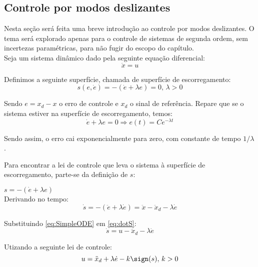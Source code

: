 \subsection{Controle por modos deslizantes}\label{S02-3}

Nesta se\c{c}\~ao ser\'a feita uma breve introdu\c{c}\~ao ao controle por modos deslizantes. O tema ser\'a explorado apenas para o controle de sistemas de segunda ordem, sem incertezas param\'etricas, para n\~ao fugir do escopo do cap\'itulo. \\

Seja um sistema din\^amico dado pela seguinte equa\c{c}\~ao diferencial:
\begin{equation} \label{eq:SimpleODE}
\ddot{x} = u
\end{equation}

Definimos a seguinte superf\'icie, chamada de superf\'icie de escorregamento:
\begin{equation} \label{eq:SlidingSurface}
s(e, \dot{e}) = - (\dot{e} + \lambda e) = 0, \, \lambda > 0
\end{equation}

Sendo $e = x_d - x$ o erro de controle e $x_d$ o sinal de refer\^encia. Repare que se o sistema estiver na superf\'icie de escorregamento, temos:
\begin{equation} \label{eq:SlidingError}
\dot{e} + \lambda e = 0 \Rightarrow e(t) = C e^{- \lambda t}
\end{equation}

Sendo assim, o erro cai exponencialmente para zero, com constante de tempo $1/\lambda$.

Para encontrar a lei de controle que leva o sistema \`a superf\'icie de escorregamento, parte-se da defini\c{c}\~ao de $s$:

$ s = -(\dot{e} + \lambda e) $ \\

Derivando no tempo:
\begin{equation} \label{eq:dotS}
\dot{s} =  -(\ddot{e} + \lambda \dot{e}) = \ddot{x} - \ddot{x}_d - \lambda \dot{e} 
\end{equation}

Substituindo \eqref{eq:SimpleODE} em \eqref{eq:dotS}:
\begin{equation} \label{dotS2}
\dot{s} = u - \ddot{x}_d - \lambda \dot{e}
\end{equation}

Utizando a seguinte lei de controle:
\begin{equation} \label{SMControlLaw1D}
u = \ddot{x}_d + \lambda \dot{e} - k \sign (s), \, k>0
\end{equation}

